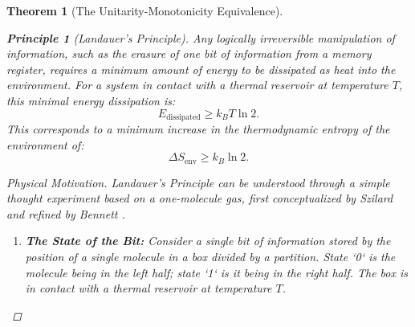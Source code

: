 \documentclass[11pt, letterpaper]{report}
\theoremstyle{plain} %
\newtheorem{theorem}{Theorem}[chapter]
\theoremstyle{definition} %
\newtheorem{principle}{Principle}[chapter]
\theoremstyle{remark} %
\begin{document}
\begin{theorem}[The Unitarity-Monotonicity Equivalence]
\begin{principle}[Landauer's Principle]
\label{principle:landauer}
Any logically irreversible manipulation of information, such as the erasure of one bit of information from a memory register, requires a minimum amount of energy to be dissipated as heat into the environment. For a system in contact with a thermal reservoir at temperature $T$, this minimal energy dissipation is:
\begin{equation}
    E_{\text{dissipated}} \ge k_B T \ln 2.
    \label{eq:landauer_energy}
\end{equation}
This corresponds to a minimum increase in the thermodynamic entropy of the environment of:
\begin{equation}
    \Delta S_{\text{env}} \ge k_B \ln 2.
    \label{eq:landauer_entropy}
\end{equation}
\end{principle}
\begin{proof}[Physical Motivation]
Landauer's Principle can be understood through a simple thought experiment based on a one-molecule gas, first conceptualized by Szilard and refined by Bennett \cite{Landauer1961, Bennett1982}.
\begin{enumerate}
    \item \textbf{The State of the Bit:} Consider a single bit of information stored by the position of a single molecule in a box divided by a partition. State `0` is the molecule being in the left half; state `1` is it being in the right half. The box is in contact with a thermal reservoir at temperature $T$.


\end{enumerate}
\end{proof}
\end{theorem}
\end{document}
